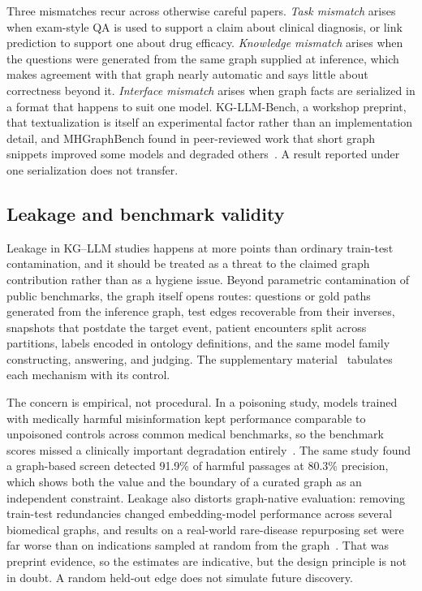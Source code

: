 Three mismatches recur across otherwise careful papers. \emph{Task mismatch} arises when exam-style QA is used to support a claim about clinical diagnosis, or link prediction to support one about drug efficacy. \emph{Knowledge mismatch} arises when the questions were generated from the same graph supplied at inference, which makes agreement with that graph nearly automatic and says little about correctness beyond it. \emph{Interface mismatch} arises when graph facts are serialized in a format that happens to suit one model. KG-LLM-Bench, a workshop preprint,  that textualization is itself an experimental factor rather than an implementation detail, and MHGraphBench found in peer-reviewed work that short graph snippets improved some models and degraded others~\cite{markowitz2025kgllmbench,liu2026mhgraphbench}. A result reported under one serialization does not transfer.

\subsection{Leakage and benchmark validity}

Leakage in KG--LLM studies happens at more points than ordinary train-test contamination, and it should be treated as a threat to the claimed graph contribution rather than as a hygiene issue. Beyond parametric contamination of public benchmarks, the graph itself opens routes: questions or gold paths generated from the inference graph, test edges recoverable from their inverses, snapshots that postdate the target event, patient encounters split across partitions, labels encoded in ontology definitions, and the same model family constructing, answering, and judging. The supplementary material~\cite{supplementary} tabulates each mechanism with its control.

The concern is empirical, not procedural. In a poisoning study, models trained with medically harmful misinformation kept performance comparable to unpoisoned controls across common medical benchmarks, so the benchmark scores missed a clinically important degradation entirely~\cite{alber2025poisoning}. The same study found a graph-based screen detected 91.9\% of harmful passages at 80.3\% precision, which shows both the value and the boundary of a curated graph as an independent constraint. Leakage also distorts graph-native evaluation: removing train-test redundancies changed embedding-model performance across several biomedical graphs, and results on a real-world rare-disease repurposing set were far worse than on indications sampled at random from the graph~\cite{briere2026leakage}. That was preprint evidence, so the estimates are indicative, but the design principle is not in doubt. A random held-out edge does not simulate future discovery.
